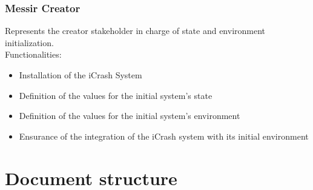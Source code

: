 \subsubsection{Messir Creator}
Represents the creator stakeholder in charge of state and environment
initialization.\\
Functionalities:
\begin{itemize}
  \item Installation of the iCrash System
  \item Definition of the values for the initial system’s state
  \item Definition of the values for the initial system’s environment
  \item Ensurance of  the integration of the iCrash system with its initial
  environment
\end{itemize}

\section{Document structure} 
